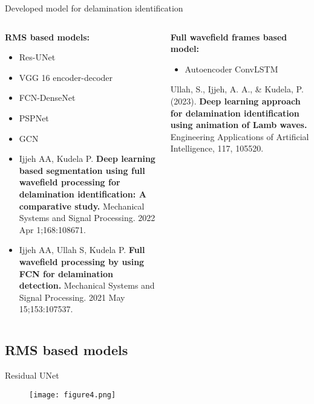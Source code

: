 \documentclass[10pt,aspectratio=169,dvipsnames]{beamer} %
\begin{document}
	\begin{frame}{Developed model for delamination identification}
		\begin{columns}[T]
			\begin{column}[t]{0.45\textwidth}
				\textbf{RMS based models: }
				\medskip
				\begin{itemize}
					\item Res-UNet
					\item VGG 16 encoder-decoder
					\item FCN-DenseNet
					\item PSPNet
					\item GCN
				\end{itemize}
				\tiny
				\begin{itemize}
					\item Ijjeh AA, Kudela P. \textbf{Deep learning based segmentation using full wavefield processing for delamination identification: A comparative study.} Mechanical Systems and Signal Processing. 2022 Apr 1;168:108671.
					\item Ijjeh AA, Ullah S, Kudela P. \textbf{Full wavefield processing by using FCN for delamination detection.} Mechanical Systems and Signal Processing. 2021 May 15;153:107537.
				\end{itemize}
			\end{column}
			\hfill
			\begin{column}[t]{.45\textwidth}
				\textbf{Full wavefield frames based model:}
				\begin{itemize}
					\item Autoencoder ConvLSTM
				\end{itemize}
				\tiny
				
				Ullah, S., Ijjeh, A. A., \& Kudela, P. (2023). \textbf{Deep learning approach for delamination identification using animation of Lamb waves.} Engineering Applications of Artificial Intelligence, 117, 105520.
			\end{column}
		\end{columns}
	\end{frame}
	
	\setcounter{subfigure}{0}
	\subsection{RMS based models}
	
	\begin{frame}{Residual UNet}
		\begin{figure}
			\centering
			\texttt{[image: figure4.png]}
		\end{figure}
	\end{frame}
	
\end{document}
